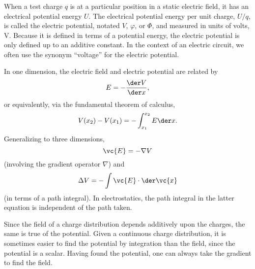 When a test charge $q$ is at a particular position in a static electric field, it has an electrical
potential energy $U$. The electrical potential energy per unit charge, $U/q$, is
called the electric potential, notated $V$, $\varphi$, or $\Phi$, and measured
in units of volts, V. Because it is defined in terms of a potential energy, the
electric potential is only defined up to an additive constant. In the context of
an electric circuit, we often use the synonym ``voltage'' for the electric potential.

In one dimension, the electric field and electric potential are related by
\begin{equation*}
  E = -\frac{\der V}{\der x},
\end{equation*}
or equivalently, via the fundamental theorem of calculus,
\begin{equation*}
  V(x_2)-V(x_1) = -\int_{x_1}^{x_2} E \der x.
\end{equation*}
Generalizing to three dimensions,
\begin{equation*}
  \vc{E} = -\nabla V
\end{equation*}
(involving the gradient operator $\nabla$) and
\begin{equation*}
  \Delta V = -\int \vc{E}\cdot\der\vc{x}
\end{equation*}
(in terms of a path integral).
In electrostatics, the path integral in the latter equation is independent
of the path taken.

Since the field of a charge distribution depends additively upon the
charges, the same is true of the potential. Given a continuous charge distribution,
it is sometimes easier to find the potential by integration than the field, since
the potential is a scalar. Having found the potential, one can always take the
gradient to find the field.

